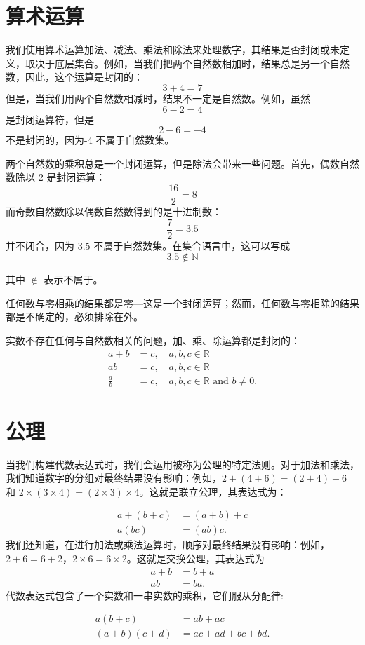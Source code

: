 \section{算术运算}
我们使用算术运算加法、减法、乘法和除法来处理数字，其结果是否封闭或未定义，取决于底层集合。例如，当我们把两个自然数相加时，结果总是另一个自然数，因此，这个运算是封闭的：
$$
3+4=7
$$
但是，当我们用两个自然数相减时，结果不一定是自然数。例如，虽然
$$
6-2=4
$$
是封闭运算符，但是
$$
2-6=-4
$$
不是封闭的，因为-4 不属于自然数集。

两个自然数的乘积总是一个封闭运算，但是除法会带来一些问题。首先，偶数自然数除以 2 是封闭运算：
$$
\frac{16}{2}=8
$$
而奇数自然数除以偶数自然数得到的是十进制数：
$$
\frac{7}{2}=3.5
$$
并不闭合，因为 3.5 不属于自然数集。在集合语言中，这可以写成
$$
3.5 \notin \mathbb{N}
$$

其中 $\notin$ 表示不属于。

任何数与零相乘的结果都是零---这是一个封闭运算；然而，任何数与零相除的结果都是不确定的，必须排除在外。

实数不存在任何与自然数相关的问题，加、乘、除运算都是封闭的：
$$
\begin{aligned}
a+b & =c, \quad a, b, c \in \mathbb{R} \\
a b & =c, \quad a, b, c \in \mathbb{R} \\
\frac{a}{b} & =c, \quad a, b, c \in \mathbb{R} \text { and } b \neq 0 .
\end{aligned}
$$

\section{公理}
当我们构建代数表达式时，我们会运用被称为公理的特定法则。对于加法和乘法，我们知道数字的分组对最终结果没有影响：例如，$2+(4+6)=(2+4)+6$ 和 $2 \times(3 \times 4)=(2\times  3)\times 4$。这就是联立公理，其表达式为：

$$
\begin{aligned}
a+(b+c) & =(a+b)+c \\
a(b c) & =(a b) c .
\end{aligned}
$$
我们还知道，在进行加法或乘法运算时，顺序对最终结果没有影响：例如，$2+6=6+2$，$2 \times 6=6 \times 2$。这就是交换公理，其表达式为
$$
\begin{aligned}
a+b & =b+a \\
a b & =b a .
\end{aligned}
$$
代数表达式包含了一个实数和一串实数的乘积，它们服从分配律:

$$
\begin{aligned}
a(b+c) & =a b+a c \\
(a+b)(c+d) & =a c+a d+b c+b d .
\end{aligned}
$$

